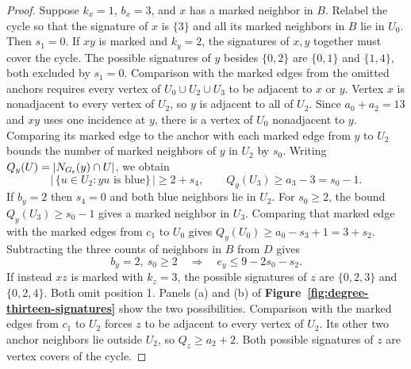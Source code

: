 \documentclass[preprint,11pt,numbers]{elsarticle-arxiv}
\numberwithin{equation}{section}
\theoremstyle{definition}
\begin{document}
\begin{proof}
Suppose $k_x=1$, $b_x=3$, and $x$ has a marked neighbor in $B$.
Relabel the cycle so that the signature of $x$ is $\{3\}$ and
all its marked neighbors in $B$ lie in $U_0$. Then $s_1=0$.
If $xy$ is marked and $k_y=2$, the signatures of $x,y$ together
must cover the cycle. The possible signatures of $y$ besides
$\{0,2\}$ are $\{0,1\}$ and $\{1,4\}$, both excluded by
$s_1=0$. Comparison with the marked edges from the omitted
anchors requires every vertex of $U_0\cup U_2\cup U_3$ to be
adjacent to $x$ or $y$. Vertex $x$ is nonadjacent to every
vertex of $U_2$, so $y$ is adjacent to all of $U_2$. Since
$a_0+a_2=13$ and $xy$ uses one incidence at $y$, there is a
vertex of $U_0$ nonadjacent to $y$. Comparing its marked edge
to the anchor with each marked edge from $y$ to $U_2$ bounds
the number of marked neighbors of $y$ in $U_2$ by $s_0$.
Writing $Q_y(U)=
|N_{G_{\rm s}}(y)\cap U|$, we obtain
\begin{equation}\label{eq:d13-two-positions}
 |\,\{u\in U_2:yu\text{ is blue}\}\,|\ge2+s_4,\qquad
 Q_y(U_3)\ge a_3-3=s_0-1.
\end{equation}
If $b_y=2$ then $s_4=0$ and both blue neighbors lie in $U_2$.
For $s_0\ge2$, the bound $Q_y(U_3)\ge s_0-1$ gives a marked
neighbor in $U_3$. Comparing that marked edge with the marked
edges from $c_1$ to $U_0$ gives $Q_y(U_0)\ge a_0-s_3+1=3+s_2$.
Subtracting the three counts of neighbors in $B$ from $D$ gives
\begin{equation}\label{eq:d13-outside-degree}
 b_y=2,\ s_0\ge2\quad\Longrightarrow\quad e_y\le9-2s_0-s_2 .
\end{equation}
If instead $xz$ is marked with $k_z=3$, the possible signatures
of $z$ are $\{0,2,3\}$ and $\{0,2,4\}$. Both omit position 1.
Panels (a) and (b) of \textbf{Figure~\ref{fig:degree-thirteen-signatures}}
show the two possibilities.
Comparison with the marked edges from $c_1$ to $U_2$ forces
$z$ to be adjacent to every vertex of $U_2$. Its other two
anchor neighbors lie outside $U_2$, so $Q_z\ge a_2+2$.
Both possible signatures of $z$ are vertex covers of the cycle.


\end{proof}
\end{document}
